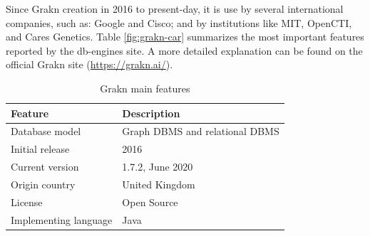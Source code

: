 Since Grakn creation in 2016 to present-day, it is use by several international 
companies, such as: Google and Cisco; and by institutions like MIT, OpenCTI, 
and Cares Genetics. Table \ref{fig:grakn-car} summarizes the most important 
features reported by the db-engines \cite{dbengines} site. A more detailed 
explanation can be found on the official Grakn site (\url{https://grakn.ai/}).

\begin{table}[H]
\caption{Grakn main features}
\begin{adjustbox}{width=\columnwidth,center}
\begin{tabular}{|l|l|}
\hline
\textbf{Feature}             & \textbf{Description}                   \\ \hline
Database model                      & Graph DBMS  and relational DBMS \\ \hline
Initial release                     & 2016                            \\ \hline
Current version                     &  1.7.2, June 2020            \\ \hline
Origin country                      & United Kingdom               \\ \hline
License                             & Open Source                  \\ \hline
Implementing language               & Java                         \\ \hline

\end{tabular}
\end{adjustbox}
\end{table}
